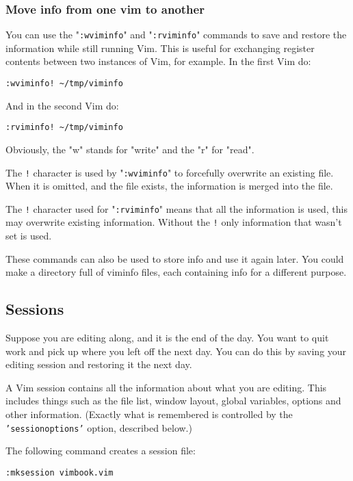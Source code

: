 \subsubsection{Move info from one vim to another}
You can use the "\texttt{:wviminfo}" and "\texttt{:rviminfo}" commands to save and restore the information while still running Vim.
This is useful for exchanging register contents between two instances of Vim, for example.
In the first Vim do:

\begin{Verbatim}[samepage=true]
 :wviminfo! ~/tmp/viminfo
\end{Verbatim}

And in the second Vim do:

\begin{Verbatim}[samepage=true]
 :rviminfo! ~/tmp/viminfo
\end{Verbatim}

Obviously, the "w" stands for "write" and the "r" for "read".

The \texttt{!} character is used by "\texttt{:wviminfo}" to forcefully overwrite an existing file.
When it is omitted, and the file exists, the information is merged into the file.

The \texttt{!} character used for "\texttt{:rviminfo}" means that all the information is used, this may overwrite existing information.
Without the \texttt{!} only information that wasn't set is used.

These commands can also be used to store info and use it again later.
You could make a directory full of viminfo files, each containing info for a different purpose.
\subsection{Sessions}
Suppose you are editing along, and it is the end of the day.
You want to quit work and pick up where you left off the next day.
You can do this by saving your editing session and restoring it the next day.

A Vim session contains all the information about what you are editing.
This includes things such as the file list, window layout, global variables, options and other information.
(Exactly what is remembered is controlled by the \texttt{'sessionoptions'} option, described below.)

The following command creates a session file:

\begin{Verbatim}[samepage=true]
 :mksession vimbook.vim
\end{Verbatim}

